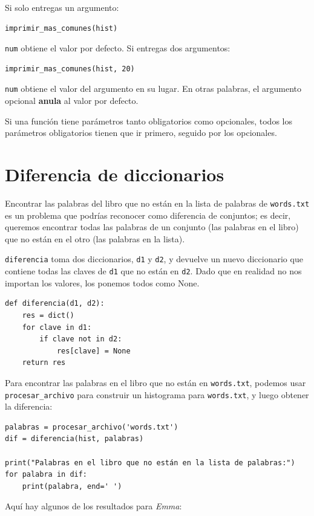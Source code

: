 \documentclass[10pt]{book}
\begin{document}
Si solo entregas un argumento:

\begin{verbatim}
imprimir_mas_comunes(hist)
\end{verbatim}

{\tt num} obtiene el valor por defecto.  Si entregas dos argumentos:

\begin{verbatim}
imprimir_mas_comunes(hist, 20)
\end{verbatim}

{\tt num} obtiene el valor del argumento en su lugar.  En otras
palabras, el argumento opcional {\bf anula} al valor por defecto.

Si una función tiene parámetros tanto obligatorios como opcionales, todos
los parámetros obligatorios tienen que ir primero, seguido por los
opcionales.


\section{Diferencia de diccionarios}
\label{dictsub}

Encontrar las palabras del libro que no están en la lista de palabras
de {\tt words.txt} es un problema que podrías reconocer como diferencia
de conjuntos; es decir, queremos encontrar todas las palabras de un
conjunto (las palabras en el libro) que no están en el otro (las
palabras en la lista).

{\tt diferencia} toma dos diccionarios, {\tt d1} y {\tt d2}, y devuelve un
nuevo diccionario que contiene todas las claves de {\tt d1} que no están
en {\tt d2}.  Dado que en realidad no nos importan los valores,
los ponemos todos como None.

\begin{verbatim}
def diferencia(d1, d2):
    res = dict()
    for clave in d1:
        if clave not in d2:
            res[clave] = None
    return res
\end{verbatim}
%
Para encontrar las palabras en el libro que no están en {\tt words.txt},
podemos usar \verb"procesar_archivo" para construir un histograma para
{\tt words.txt}, y luego obtener la diferencia:

\begin{verbatim}
palabras = procesar_archivo('words.txt')
dif = diferencia(hist, palabras)

print("Palabras en el libro que no están en la lista de palabras:")
for palabra in dif:
    print(palabra, end=' ')
\end{verbatim}
%
Aquí hay algunos de los resultados para {\em Emma}:
\end{document}
